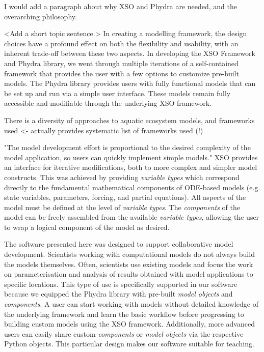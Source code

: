 \documentclass[journal abbreviation, manuscript]{copernicus}
\begin{document}
I would add a paragraph about why XSO and Phydra are needed, and the overarching philosophy. 

<Add a short topic sentence.> In creating a modelling framework, the design choices have a profound effect on both the flexibility and usability, with an inherent trade-off between these two aspects. In developing the XSO Framework and Phydra library, we went through multiple iterations of a self-contained framework that provides the user with a few options to customize pre-built models. The Phydra library provides users with fully functional models that can be set up and run via a simple user interface. These models remain fully accessible and modifiable through the underlying XSO framework.

There is a diversity of approaches to aquatic ecosystem models, and frameworks used
\citep{Janssen2015ExploringPerspective} <- actually provides systematic list of frameworks used (!)



"The model development effort is proportional to the desired complexity of the model application, so users can quickly implement simple models."
XSO provides an interface for iterative modifications, both to more complex and simpler model constructs. This was achieved by providing \textit{variable types} which correspond directly to the fundamental mathematical components of ODE-based models (e.g. state variables, parameters, forcing, and partial equations). All aspects of the model must be defined at the level of \textit{variable types}. The \textit{components} of the model can be freely assembled from the available \textit{variable types}, allowing the user to wrap a logical component of the model as desired.

The software presented here was designed to support collaborative model development. Scientists working with computational models do not always build the models themselves. Often, scientists use existing models and focus the work on parameterisation and analysis of results obtained with model applications to specific locations. This type of use is specifically supported in our software because we equipped the Phydra library with pre-built \textit{model objects} and \textit{components}. A user can start working with models without detailed knowledge of the underlying framework and learn the basic workflow before progressing to building custom models using the XSO framework. Additionally, more advanced users can easily share custom \textit{components} or \textit{model objects} via the respective Python objects. This particular design makes our software suitable for teaching. 
\end{document}
